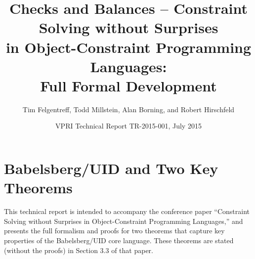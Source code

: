 \documentclass{article}
\begin{document}
\reversemarginpar

\title{Checks and Balances -- Constraint Solving without Surprises \\
in Object-Constraint Programming Languages: \\
Full Formal Development}
\author{Tim Felgentreff, Todd Millstein, Alan Borning, and Robert Hirschfeld}

\date{VPRI Technical Report TR-2015-001, July 2015}


\maketitle

\section{Babelsberg/UID and Two Key Theorems}

This technical report is intended to accompany the conference paper
``Constraint Solving without Surprises in Object-Constraint
Programming Languages,'' and presents the full formalism and proofs
for two theorems that capture key properties of the Babelsberg/UID
core language.  These theorems are stated (without the proofs) in
Section 3.3 of that paper.


\newcommand{\sharedsection}{\subsection}


\end{document}
